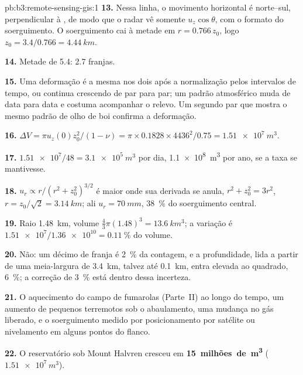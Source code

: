 \begin{solution}{pb:b3:remote-sensing-gis:1}
\textbf{13.} Nessa linha, o movimento horizontal é norte--sul,
perpendicular à , de modo que o radar vê somente $u_z\cos\theta$, com o formato do
soerguimento. O soerguimento cai à metade em $r = 0.766\,z_0$, logo $z_0 =
3.4/0.766 = \qty{4.44}{km}$.

\textbf{14.} Metade de 5.4: 2.7 franjas.

\textbf{15.} Uma deformação é a mesma nos dois  após a normalização pelos intervalos de tempo,
ou continua crescendo de par para par; um padrão atmosférico
muda de data para data e costuma acompanhar o
relevo. Um segundo par que mostra o mesmo padrão de olho de boi confirma a
deformação.

\textbf{16.} $\Delta V = \pi u_z(0)z_0^2/(1 - \nu) = \pi\times0.1828\times
4436^2/0.75 = \qty{1.51e7}{m^3}$.

\textbf{17.} $\num{1.51e7}/48 = \qty{3.1e5}{m^3}$ por dia, \qty{1.1e8}{m^3}
por ano, se a taxa se mantivesse.

\textbf{18.} $u_r \propto r/(r^2 + z_0^2)^{3/2}$ é maior onde sua
derivada se anula, $r^2 + z_0^2 = 3r^2$, $r = z_0/\sqrt2 = \qty{3.14}{km}$;
ali $u_r = \qty{70}{mm}$, \qty{38}{\percent} do soerguimento central.

\textbf{19.} Raio \qty{1.48}{km}, volume $\frac43\pi(1.48)^3 =
\qty{13.6}{km^3}$; a variação é $\num{1.51e7}/\num{1.36e10} =
\qty{0.11}{\percent}$ do volume.

\textbf{20.} Não: um décimo de franja é \qty{2}{\percent} da contagem, e
a profundidade, lida a partir de uma meia-largura de \qty{3.4}{km}, talvez até
\qty{0.1}{km}, entra elevada ao quadrado, \qty{6}{\percent}; a correção de \qty{3}{\percent}
está dentro dessa incerteza.

\textbf{21.} O aquecimento do campo de fumarolas (Parte~II) ao longo do tempo, um
aumento de pequenos terremotos sob o abaulamento, uma mudança no gás
liberado, e o soerguimento medido por posicionamento por satélite ou nivelamento em
alguns pontos do flanco.

\textbf{22.} O reservatório sob Mount Halvren cresceu em
\textbf{15~milhões~de~\unit[text-series-to-math=true]{m^3}} ($\num{1.51e7}\,\unit{m^3}$).
\end{solution}
